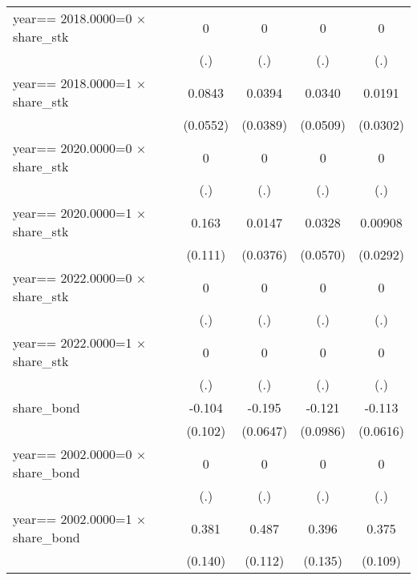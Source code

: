 \begin{table}[htbp]
\begin{tabular}{l*{4}{c}}
year==  2018.0000=0 $\times$ share\_stk&        0         &        0         &        0         &        0         \\
                &      (.)         &      (.)         &      (.)         &      (.)         \\
year==  2018.0000=1 $\times$ share\_stk&   0.0843         &   0.0394         &   0.0340         &   0.0191         \\
                & (0.0552)         & (0.0389)         & (0.0509)         & (0.0302)         \\
year==  2020.0000=0 $\times$ share\_stk&        0         &        0         &        0         &        0         \\
                &      (.)         &      (.)         &      (.)         &      (.)         \\
year==  2020.0000=1 $\times$ share\_stk&    0.163         &   0.0147         &   0.0328         &  0.00908         \\
                &  (0.111)         & (0.0376)         & (0.0570)         & (0.0292)         \\
year==  2022.0000=0 $\times$ share\_stk&        0         &        0         &        0         &        0         \\
                &      (.)         &      (.)         &      (.)         &      (.)         \\
year==  2022.0000=1 $\times$ share\_stk&        0         &        0         &        0         &        0         \\
                &      (.)         &      (.)         &      (.)         &      (.)         \\
share\_bond      &   -0.104         &   -0.195\sym{***}&   -0.121         &   -0.113\sym{*}  \\
                &  (0.102)         & (0.0647)         & (0.0986)         & (0.0616)         \\
year==  2002.0000=0 $\times$ share\_bond&        0         &        0         &        0         &        0         \\
                &      (.)         &      (.)         &      (.)         &      (.)         \\
year==  2002.0000=1 $\times$ share\_bond&    0.381\sym{***}&    0.487\sym{***}&    0.396\sym{***}&    0.375\sym{***}\\
                &  (0.140)         &  (0.112)         &  (0.135)         &  (0.109)         \\

\end{tabular}
\end{table}
